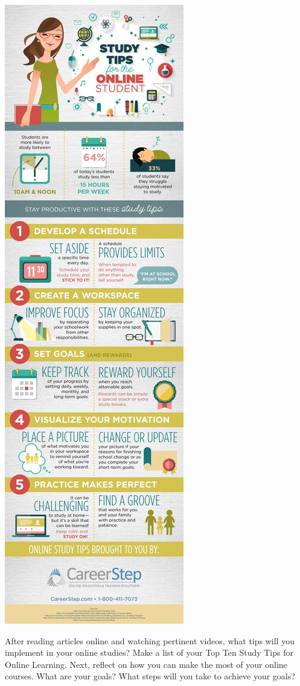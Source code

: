 \documentclass[
]{book}
\theoremstyle{definition}
\theoremstyle{definition}
\theoremstyle{definition}
\theoremstyle{definition}
\theoremstyle{remark}
\begin{document}
\begin{reflect}
\includegraphics{assets/u1/5-Great-Study-Tips-For-Online-Students-Infographic.jpg}

After reading articles online and watching pertinent videos, what tips will you implement in your online studies?
Make a list of your Top Ten Study Tips for Online Learning. Next, reflect on how you can make the most of your online courses. What are your goals? What steps will you take to achieve your goals?
\end{reflect}
\end{document}
